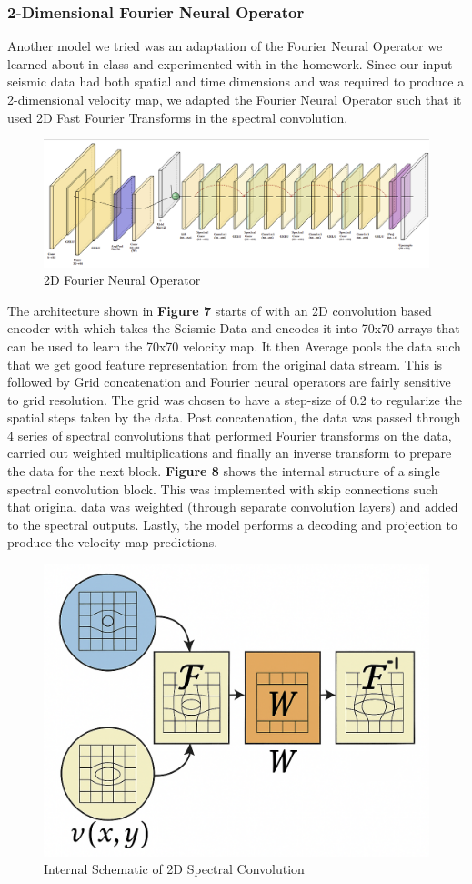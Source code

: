 \documentclass{article}
\begin{document}
\subsubsection{2-Dimensional Fourier Neural Operator}

Another model we tried was an adaptation of the Fourier Neural Operator we learned about in class and experimented with in the homework. Since our input seismic data had both spatial and time dimensions and was required to produce a 2-dimensional velocity map, we adapted the Fourier Neural Operator such that it used 2D Fast Fourier Transforms in the spectral convolution.

\begin{figure}[H]
    \centering
    \includegraphics[width=0.5\linewidth]{figures/FNO2D.png}
    \caption{2D Fourier Neural Operator}
    \label{fig:fno-2d}
\end{figure}

The architecture shown in \textbf{Figure 7} starts of with an 2D convolution based encoder with which takes the Seismic Data and encodes it into 70x70 arrays that can be used to learn the 70x70 velocity map. It then Average pools the data such that we get good feature representation from the original data stream. This is followed by Grid concatenation and Fourier neural operators are fairly sensitive to grid resolution. The grid was chosen to have a step-size of 0.2 to regularize the spatial steps taken by the data. Post concatenation, the data was passed through 4 series of spectral convolutions that performed Fourier transforms on the data,  carried out weighted multiplications and finally an inverse transform to prepare the data for the next block. \textbf{Figure 8} shows the internal structure of a single spectral convolution block. This was implemented with skip connections such that original data was weighted (through separate convolution layers) and added to the spectral outputs. Lastly, the model performs a decoding and projection to produce the velocity map predictions.

\begin{figure}[H]
    \centering
    \includegraphics[width=0.5\linewidth]{figures/spectralconv2d.png}
    \caption{Internal Schematic of 2D Spectral Convolution}
    \label{fig:fno-2d}
\end{figure}
\end{document}
